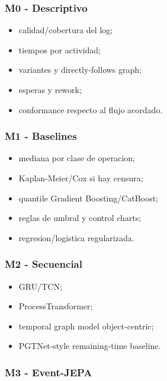 \documentclass[
  spanish,
  10pt,
  a4paper,
]{article}
\providecommand{\tightlist}{%
  \setlength{\itemsep}{0pt}\setlength{\parskip}{0pt}}
\begin{document}
\subsubsection{M0 - Descriptivo}\label{m0---descriptivo}

\begin{itemize}
\tightlist
\item
  calidad/cobertura del log;
\item
  tiempos por actividad;
\item
  variantes y directly-follows graph;
\item
  esperas y rework;
\item
  conformance respecto al flujo acordado.
\end{itemize}

\subsubsection{M1 - Baselines}\label{m1---baselines}

\begin{itemize}
\tightlist
\item
  mediana por clase de operacion;
\item
  Kaplan-Meier/Cox si hay censura;
\item
  quantile Gradient Boosting/CatBoost;
\item
  reglas de umbral y control charts;
\item
  regresion/logistica regularizada.
\end{itemize}

\subsubsection{M2 - Secuencial}\label{m2---secuencial}

\begin{itemize}
\tightlist
\item
  GRU/TCN;
\item
  ProcessTransformer;
\item
  temporal graph model object-centric;
\item
  PGTNet-style remaining-time baseline.
\end{itemize}

\subsubsection{M3 - Event-JEPA}\label{m3---event-jepa}
\end{document}
